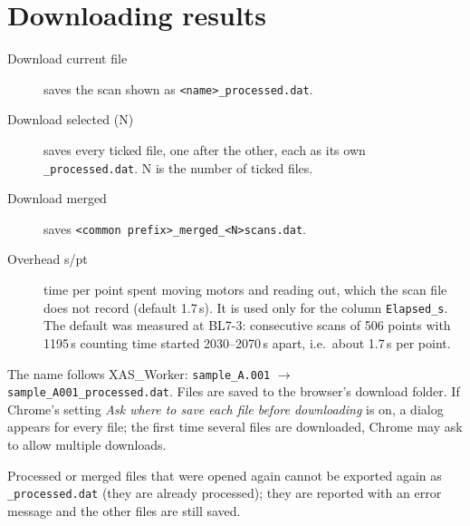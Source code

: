 \documentclass[11pt,a4paper]{article}
\newcommand{\file}[1]{\texttt{#1}}
\newcommand{\col}[1]{\texttt{#1}}                  %
\begin{document}
\section{Downloading results}
\begin{description}
  \item[Download current file] saves the scan shown as \file{<name>\_processed.dat}.
  \item[Download selected (N)] saves every ticked file, one after the other, each as its own
        \file{\_processed.dat}. N is the number of ticked files.
  \item[Download merged] saves \file{<common prefix>\_merged\_<N>scans.dat}.
  \item[Overhead s/pt] time per point spent moving motors and reading out, which the scan file does
        not record (default 1.7\,s). It is used only for the column \col{Elapsed\_s}. The default was
        measured at BL7-3: consecutive scans of 506 points with 1195\,s counting time started
        2030--2070\,s apart, i.e.\ about 1.7\,s per point.
\end{description}
The name follows XAS\_Worker: \file{sample\_A.001} $\to$ \file{sample\_A001\_processed.dat}.
Files are saved to the browser's download folder. If Chrome's setting \emph{Ask where
to save each file before downloading} is on, a dialog appears for every file; the
first time several files are downloaded, Chrome may ask to allow multiple downloads.

\begin{note}
Processed or merged files that were opened again cannot be exported again as
\file{\_processed.dat} (they are already processed); they are reported with an
error message and the other files are still saved.
\end{note}
\end{document}
